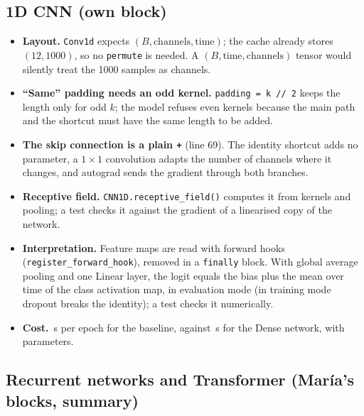 


\subsection{1D CNN (own block)}



\begin{itemize}[leftmargin=1.2em,itemsep=1pt]
  \item \textbf{Layout.} \texttt{Conv1d} expects $(B, \text{channels}, \text{time})$; the cache already
        stores $(12, 1000)$, so no \texttt{permute} is needed. A $(B, \text{time}, \text{channels})$
        tensor would silently treat the 1000 samples as channels.
  \item \textbf{``Same'' padding needs an odd kernel.} \texttt{padding = k // 2} keeps the length only
        for odd $k$; the model refuses even kernels because the main path and the shortcut must have the
        same length to be added.
  \item \textbf{The skip connection is a plain \texttt{+}} (line 69). The identity shortcut adds no
        parameter, a $1\times1$ convolution adapts the number of channels where it changes, and autograd
        sends the gradient through both branches.
  \item \textbf{Receptive field.} \texttt{CNN1D.receptive\_field()} computes it from kernels and pooling;
        a test checks it against the gradient of a linearised copy of the network.
  \item \textbf{Interpretation.} Feature maps are read with forward hooks
        (\texttt{register\_forward\_hook}), removed in a \texttt{finally} block. With global average
        pooling and one Linear layer, the logit equals the bias plus the mean over time of the class
        activation map, in evaluation mode (in training mode dropout breaks the identity); a test checks
        it numerically.
  \item \textbf{Cost.} \cnnEpochTimeMeanBase{}\,s per epoch for the baseline, against
        \denseEpochTimeMeanBase{}\,s for the Dense network, with \cnnParamsBase{} parameters.
\end{itemize}



\subsection{Recurrent networks and Transformer (Mar\'ia's blocks, summary)}

